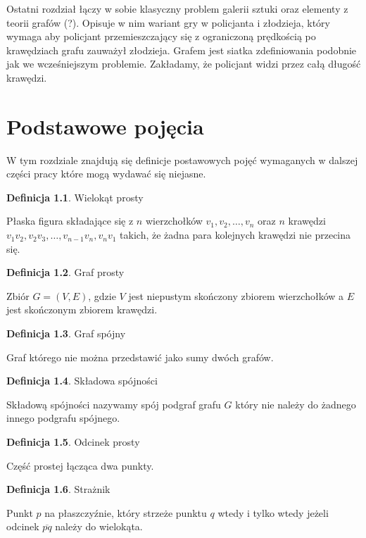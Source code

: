 \documentclass[brudnopis]{xmgr}
\theoremstyle{definition}
\newtheorem{Definicja}{Definicja}
\begin{document}
Ostatni rozdział łączy w sobie klasyczny problem galerii sztuki oraz elementy z teorii grafów (?). Opisuje w nim wariant gry w policjanta i złodzieja, który wymaga aby policjant przemieszczający się z ograniczoną prędkością po krawędziach grafu zauważył złodzieja. Grafem jest siatka zdefiniowania podobnie jak we wcześniejszym problemie. Zakładamy, że policjant widzi przez całą długość krawędzi.


\chapter{Podstawowe pojęcia}
W tym rozdziale znajdują się definicje postawowych pojęć wymaganych w dalszej części pracy które mogą wydawać się niejasne.

\begin{Definicja}{Wielokąt prosty}

  Płaska figura składające się z $n$ wierzchołków $v_1, v_2,\ldots, v_n$ oraz $n$ krawędzi $v_1v_2, v_2v_3, \ldots, v_{n-1}v_n,v_nv_1$ takich, że żadna para kolejnych krawędzi nie przecina się.
\end{Definicja}

\begin{Definicja}{Graf prosty}

  Zbiór $G = (V,E)$, gdzie $V$ jest niepustym skończony zbiorem wierzchołków a $E$ jest skończonym zbiorem krawędzi.
\end{Definicja}

\begin{Definicja}{Graf spójny}

  Graf którego nie można przedstawić jako sumy dwóch grafów.
\end{Definicja}

\begin{Definicja}{Składowa spójności}
  
  Składową spójności nazywamy spój podgraf grafu $G$ który nie należy do żadnego innego podgrafu spójnego.
\end{Definicja}

\begin{Definicja}{Odcinek prosty}

  Część prostej łącząca dwa punkty.
\end{Definicja}

\begin{Definicja}{Strażnik}

  Punkt $p$ na płaszczyźnie, który strzeże punktu $q$ wtedy i tylko wtedy jeżeli odcinek $\overline{pq}$ należy do wielokąta.
\end{Definicja}
\end{document}
